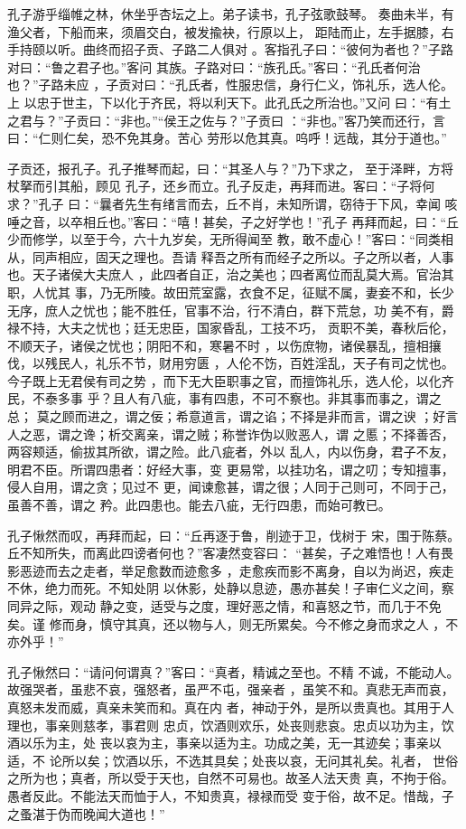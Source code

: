 \documentclass[a4paper,12pt,UTF8,twoside]{ctexbook}
\begin{document}
孔子游乎缁帷之林，休坐乎杏坛之上。弟子读书，孔子弦歌鼓琴。 奏曲未半，有渔父者，下船而来，须眉交白，被发揄袂，行原以上， 距陆而止，左手据膝，右手持颐以听。曲终而招子贡、子路二人俱对 。客指孔子曰：“彼何为者也？”子路对曰：“鲁之君子也。”客问 其族。子路对曰：“族孔氏。”客曰：“孔氏者何治也？”子路未应 ，子贡对曰：“孔氏者，性服忠信，身行仁义，饰礼乐，选人伦。上 以忠于世主，下以化于齐民，将以利天下。此孔氏之所治也。”又问 曰：“有土之君与？”子贡曰：“非也。”“侯王之佐与？”子贡曰 ：“非也。”客乃笑而还行，言曰：“仁则仁矣，恐不免其身。苦心 劳形以危其真。呜呼！远哉，其分于道也。”

子贡还，报孔子。孔子推琴而起，曰：“其圣人与？”乃下求之， 至于泽畔，方将杖拏而引其船，顾见 孔子，还乡而立。孔子反走，再拜而进。客曰：“子将何求？”孔子 曰：“曩者先生有绪言而去，丘不肖，未知所谓，窃待于下风，幸闻 咳唾之音，以卒相丘也。”客曰：“嘻！甚矣，子之好学也！”孔子 再拜而起，曰：“丘少而修学，以至于今，六十九岁矣，无所得闻至 教，敢不虚心！”客曰：“同类相从，同声相应，固天之理也。吾请 释吾之所有而经子之所以。子之所以者，人事也。天子诸侯大夫庶人 ，此四者自正，治之美也；四者离位而乱莫大焉。官治其职，人忧其 事，乃无所陵。故田荒室露，衣食不足，征赋不属，妻妾不和，长少 无序，庶人之忧也；能不胜任，官事不治，行不清白，群下荒怠，功 美不有，爵禄不持，大夫之忧也；廷无忠臣，国家昏乱，工技不巧， 贡职不美，春秋后伦，不顺天子，诸侯之忧也；阴阳不和，寒暑不时 ，以伤庶物，诸侯暴乱，擅相攘伐，以残民人，礼乐不节，财用穷匮 ，人伦不饬，百姓淫乱，天子有司之忧也。今子既上无君侯有司之势 ，而下无大臣职事之官，而擅饰礼乐，选人伦，以化齐民，不泰多事 乎？且人有八疵，事有四患，不可不察也。非其事而事之，谓之总； 莫之顾而进之，谓之佞；希意道言，谓之谄；不择是非而言，谓之谀 ；好言人之恶，谓之谗；析交离亲，谓之贼；称誉诈伪以败恶人，谓 之慝；不择善否，两容颊适，偷拔其所欲，谓之险。此八疵者，外以 乱人，内以伤身，君子不友，明君不臣。所谓四患者：好经大事，变 更易常，以挂功名，谓之叨；专知擅事，侵人自用，谓之贪；见过不 更，闻谏愈甚，谓之很；人同于己则可，不同于己，虽善不善，谓之 矜。此四患也。能去八疵，无行四患，而始可教已。

孔子愀然而叹，再拜而起，曰：“丘再逐于鲁，削迹于卫，伐树于 宋，围于陈蔡。丘不知所失，而离此四谤者何也？”客凄然变容曰： “甚矣，子之难悟也！人有畏影恶迹而去之走者，举足愈数而迹愈多 ，走愈疾而影不离身，自以为尚迟，疾走不休，绝力而死。不知处阴 以休影，处静以息迹，愚亦甚矣！子审仁义之间，察同异之际，观动 静之变，适受与之度，理好恶之情，和喜怒之节，而几于不免矣。谨 修而身，慎守其真，还以物与人，则无所累矣。今不修之身而求之人 ，不亦外乎！”

孔子愀然曰：“请问何谓真？”客曰：“真者，精诚之至也。不精 不诚，不能动人。故强哭者，虽悲不哀，强怒者，虽严不屯，强亲者 ，虽笑不和。真悲无声而哀，真怒未发而威，真亲未笑而和。真在内 者，神动于外，是所以贵真也。其用于人理也，事亲则慈孝，事君则 忠贞，饮酒则欢乐，处丧则悲哀。忠贞以功为主，饮酒以乐为主，处 丧以哀为主，事亲以适为主。功成之美，无一其迹矣；事亲以适，不 论所以矣；饮酒以乐，不选其具矣；处丧以哀，无问其礼矣。礼者， 世俗之所为也；真者，所以受于天也，自然不可易也。故圣人法天贵 真，不拘于俗。愚者反此。不能法天而恤于人，不知贵真，禄禄而受 变于俗，故不足。惜哉，子之蚤湛于伪而晚闻大道也！”
\end{document}
